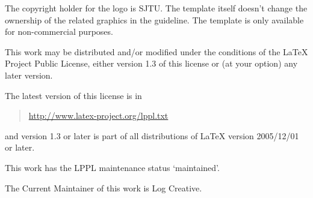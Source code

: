 \documentclass[a4paper,12pt]{article}
\begin{document}
\begin{CJK}{UTF8}{song}
The copyright holder for the logo is SJTU. The template itself doesn't change the ownership of the related graphics in the guideline. The template is only available for non-commercial purposes.

This work may be distributed and/or modified under the
conditions of the \LaTeX{} Project Public License, either version 1.3 of this license or (at your option) any later version.

The latest version of this license is in
\begin{quotation}
    \href{http://www.latex-project.org/lppl.txt}{http://www.latex-project.org/lppl.txt}
\end{quotation}
and version 1.3 or later is part of all distributions of \LaTeX{}
version 2005/12/01 or later.

This work has the LPPL maintenance status `maintained'.

The Current Maintainer of this work is Log Creative.

\vfill

%

\end{CJK}
\end{document}
